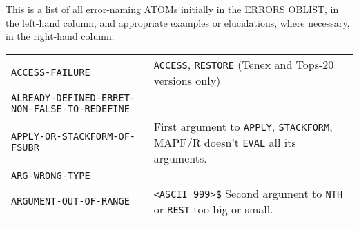 \documentclass[a4paper]{scrbook}
\begin{document}
\label{appendix-4.-error-messages}

This is a list of all error-naming ATOMs initially in the ERRORS OBLIST, in the left-hand column, and appropriate examples
or elucidations, where necessary, in the right-hand column.

\begin{longtable}[]{@{}ll@{}}
\toprule
\begin{minipage}[t]{0.58\columnwidth}\raggedright\strut
\texttt{ACCESS-FAILURE}\strut
\end{minipage} & \begin{minipage}[t]{0.36\columnwidth}\raggedright\strut
\texttt{ACCESS}, \texttt{RESTORE} (Tenex and Tops-20 versions only)\strut
\end{minipage}\tabularnewline
\begin{minipage}[t]{0.58\columnwidth}\raggedright\strut
\texttt{ALREADY-DEFINED-ERRET-NON-FALSE-TO-REDEFINE}\strut
\end{minipage} & \begin{minipage}[t]{0.36\columnwidth}\raggedright\strut
\strut
\end{minipage}\tabularnewline
\begin{minipage}[t]{0.58\columnwidth}\raggedright\strut
\texttt{APPLY-OR-STACKFORM-OF-FSUBR}\strut
\end{minipage} & \begin{minipage}[t]{0.36\columnwidth}\raggedright\strut
First argument to \texttt{APPLY}, \texttt{STACKFORM}, MAPF/R doesn't \texttt{EVAL} all its arguments.\strut
\end{minipage}\tabularnewline
\begin{minipage}[t]{0.58\columnwidth}\raggedright\strut
\texttt{ARG-WRONG-TYPE}\strut
\end{minipage} & \begin{minipage}[t]{0.36\columnwidth}\raggedright\strut
\strut
\end{minipage}\tabularnewline
\begin{minipage}[t]{0.58\columnwidth}\raggedright\strut
\texttt{ARGUMENT-OUT-OF-RANGE}\strut
\end{minipage} & \begin{minipage}[t]{0.36\columnwidth}\raggedright\strut
\texttt{\textless{}ASCII\ 999\textgreater{}\$} Second argument to \texttt{NTH} or \texttt{REST} too big or small.\strut
\end{minipage}\tabularnewline
\begin{minipage}[t]{0.58\columnwidth}\raggedright\strut

\end{minipage}
\end{longtable}
\end{document}
